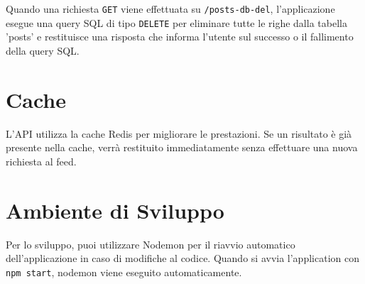 \documentclass{article}
\begin{document}
Quando una richiesta \texttt{GET} viene effettuata su \texttt{/posts-db-del}, l'applicazione esegue una query SQL di tipo \texttt{DELETE} per eliminare tutte le righe dalla tabella 'posts' e restituisce una risposta che informa l'utente sul successo o il fallimento della query SQL.

\section{Cache}
L'API utilizza la cache Redis per migliorare le prestazioni. Se un risultato è già presente nella cache, verrà restituito immediatamente senza effettuare una nuova richiesta al feed.

\section{Ambiente di Sviluppo}
Per lo sviluppo, puoi utilizzare Nodemon per il riavvio automatico dell'applicazione in caso di modifiche al codice.
Quando si avvia l'application con \texttt{npm start}, nodemon viene eseguito automaticamente.
\end{document}
